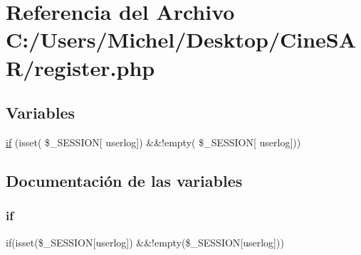 \hypertarget{register_8php}{}\section{Referencia del Archivo C\+:/\+Users/\+Michel/\+Desktop/\+Cine\+S\+A\+R/register.php}
\label{register_8php}
\subsection*{Variables}
\begin{DoxyCompactItemize}
\item 
\mbox{\hyperlink{register_8php_aefb5893336d7ead40ae915367f4b82cc}{if}} (isset( \$\+\_\+\+S\+E\+S\+S\+I\+ON\mbox{[} \textquotesingle{}userlog\textquotesingle{}\mbox{]}) \&\&!empty( \$\+\_\+\+S\+E\+S\+S\+I\+ON\mbox{[} \textquotesingle{}userlog\textquotesingle{}\mbox{]}))
\end{DoxyCompactItemize}


\subsection{Documentación de las variables}
\mbox{\label{register_8php_aefb5893336d7ead40ae915367f4b82cc}} 
\subsubsection{\texorpdfstring{if}{if}}
{\footnotesize\ttfamily if(isset(\$\+\_\+\+S\+E\+S\+S\+I\+ON\mbox{[}\textquotesingle{}userlog\textquotesingle{}\mbox{]}) \&\&!empty(\$\+\_\+\+S\+E\+S\+S\+I\+ON\mbox{[}\textquotesingle{}userlog\textquotesingle{}\mbox{]}))}

